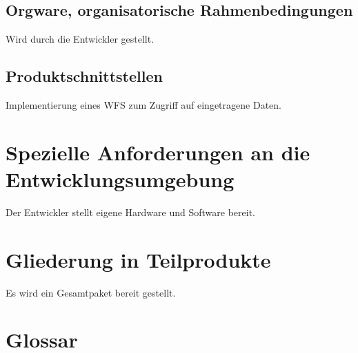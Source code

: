 \documentclass[a4paper,11pt]{article}             %
\begin{document}
	\subsection{Orgware, organisatorische Rahmenbedingungen}
		Wird durch die Entwickler gestellt.
	\subsection{Produktschnittstellen}
		Implementierung eines WFS zum Zugriff auf eingetragene Daten.
\section{Spezielle Anforderungen an die Entwicklungsumgebung}
	Der Entwickler stellt eigene Hardware und Software bereit.
\section{Gliederung in Teilprodukte}
	Es wird ein Gesamtpaket bereit gestellt.

\section{Glossar}
\end{document}
